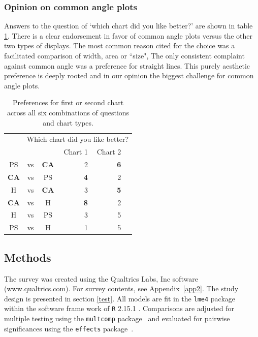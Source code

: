 \subsubsection*{Opinion on common angle plots}
Answers to the question of `which chart did you like better?' are shown in table \ref{tab:prefer}. There is a  clear endorsement in favor of common angle plots versus the other two types of displays.
The most common reason cited for the choice was a facilitated comparison of width, area or ``size", 
The only consistent complaint against common angle was a preference for straight lines.
 This purely aesthetic preference is deeply rooted and in our opinion the biggest challenge for common angle plots.
\begin{table}[ht]
\begin{center}
\begin{tabular}{cccrrr}
  \hline
&\multicolumn{5}{r}{Which chart did you like better?}\\
&&& Chart 1 &  Chart 2 \\ 
  \hline
  PS &vs&  {\bf CA} & 2 & \bf 6 \\ 
 {\bf  CA} & vs &  PS & \bf 4 & 2 \\ 
  H & vs &   {\bf  CA} & 3 & \bf 5 \\ 
   {\bf  CA} & vs &  H & \bf 8 & 2 \\ 
  H & vs &  PS & 3 & 5 \\ 
  PS & vs &  H & 1 & 5 \\ 
   \hline
\end{tabular}
\caption{\label{tab:prefer} Preferences for first or second chart across all six combinations of questions and chart types. }
\vspace{-0.3in}
\end{center}
\end{table}

\subsection{Methods}

The survey was created using the Qualtrics Labs, Inc software (www.qualtrics.com). For survey contents, see Appendix~\ref{app2}. The study design is presented in section \ref{test}. All models are fit in the {\tt lme4} package~\cite{lmer} within the software frame work of {\tt R} 2.15.1 \cite{R}. Comparisons are adjusted for multiple testing using the {\tt multcomp} package~\cite{multcomp} and evaluated for pairwise significances using the {\tt effects} package~\cite{effects}.


